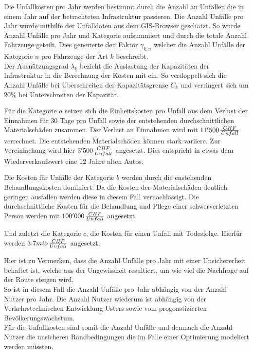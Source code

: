 \newpage

Die Unfallkosten pro Jahr werden bestimmt durch die Anzahl an Unfällen die in einem Jahr auf der betrachteten Infrastruktur passieren. Die Anzahl Unfälle pro Jahr wurde mithilfe der Unfalldaten aus dem GIS-Browser geschätzt. So wurde Anzahl Unfälle pro Jahr und Kategorie aufsummiert und durch die totale Anzahl Fahrzeuge geteilt. Dies generierte den Faktor \( \gamma_{k,n} \) welcher die Anzahl Unfälle der Kategorie $n$ pro Fahrzeuge der Art $k$ beschreibt. \\
Der Ausnützungsgrad \( \lambda_{k} \) bezieht die Auslastung der Kapazitäten der Infrastruktur in die Berechnung der Kosten mit ein. So verdoppelt sich die Anzahl Unfälle bei Überschreiten der Kapazitätsgrenze $C_{k}$ und verringert sich um 20\% bei Unterschreiten der Kapazität.

\begin{IMleftrightskip}
Für die Kategorie $a$ setzen sich die Einheitskosten pro Unfall aus dem Verlust der Einnahmen für 30 Tage pro Unfall sowie der entstehenden durchschnittlichen Materialschäden zusammen. Der Verlust an Einnahmen wird mit $11'500 \thinspace \frac{CHF}{Unfall}$ verrechnet. Die entstehenden Materialschäden können stark variiere. Zur Vereinfachung wird hier $3'500 \thinspace \frac{CHF}{Unfall}$ angesetzt. Dies entspricht in etwas dem Wiederverkaufswert eine 12 Jahre alten Autos.

Die Kosten für Unfälle der Kategorie $b$ werden durch die enstehenden Behandlungskosten dominiert. Da die Kosten der Materialschäden deutlich geringen ausfallen werden diese in diesem Fall vernachlässigt. Die durchschnittliche Kosten für die Behandlung und Pflege einer schwerverletzten Person werden mit $100'000 \thinspace \frac{CHF}{Unfall}$ angesetzt.

Und zuletzt die Kategorie $c$, die Kosten für einen Unfall mit Todesfolge. Hierfür werden $3.7mio \thinspace \frac{CHF}{Unfall}$ angesetzt. 
\end{IMleftrightskip}

Hier ist zu Vermerken, dass die Anzahl Unfälle pro Jahr mit einer Unsichererheit behaftet ist, welche aus der Ungewissheit resultiert, um wie viel die Nachfrage auf der Route steigen wird. \\ [2ex]
So ist in diesem Fall die Anzahl Unfälle pro Jahr abhängig von der Anzahl Nutzer pro Jahr. Die Anzahl Nutzer wiederum ist abhängig von der Verkehrstechnischen Entwicklung Usters sowie vom progonstizierten Bevölkerungswachstum. \\
Für die Unfallkosten sind somit die Anzahl Unfälle und demnach die Anzahl Nutzer die unsicheren Randbedingungen die im Falle einer Optimierung modeliert werden müssten.



%

